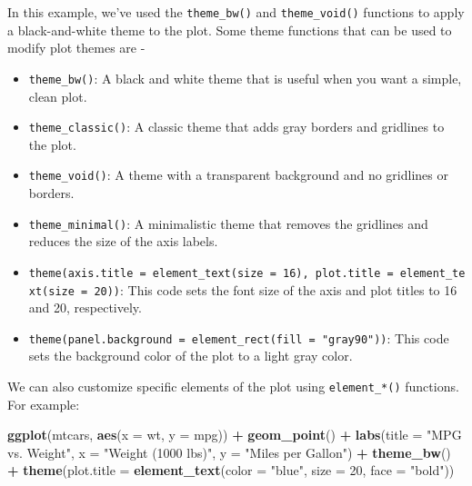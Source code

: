 \documentclass[
]{book}
\newenvironment{Shaded}{\begin{snugshade}}{\end{snugshade}}
\newcommand{\AttributeTok}[1]{\textcolor[rgb]{0.13,0.29,0.53}{#1}}
\newcommand{\DecValTok}[1]{\textcolor[rgb]{0.00,0.00,0.81}{#1}}
\newcommand{\FunctionTok}[1]{\textcolor[rgb]{0.13,0.29,0.53}{\textbf{#1}}}
\newcommand{\NormalTok}[1]{#1}
\newcommand{\SpecialCharTok}[1]{\textcolor[rgb]{0.81,0.36,0.00}{\textbf{#1}}}
\newcommand{\StringTok}[1]{\textcolor[rgb]{0.31,0.60,0.02}{#1}}
\providecommand{\tightlist}{%
  \setlength{\itemsep}{0pt}\setlength{\parskip}{0pt}}
\begin{document}
In this example, we've used the \texttt{theme\_bw()} and \texttt{theme\_void()} functions to apply a black-and-white theme to the plot. Some theme functions that can be used to modify plot themes are -

\begin{itemize}
\tightlist
\item
  \texttt{theme\_bw()}: A black and white theme that is useful when you want a simple, clean plot.
\item
  \texttt{theme\_classic()}: A classic theme that adds gray borders and gridlines to the plot.
\item
  \texttt{theme\_void()}: A theme with a transparent background and no gridlines or borders.
\item
  \texttt{theme\_minimal()}: A minimalistic theme that removes the gridlines and reduces the size of the axis labels.
\item
  \texttt{theme(axis.title\ =\ element\_text(size\ =\ 16),\ plot.title\ =\ element\_text(size\ =\ 20))}: This code sets the font size of the axis and plot titles to 16 and 20, respectively.
\item
  \texttt{theme(panel.background\ =\ element\_rect(fill\ =\ "gray90"))}: This code sets the background color of the plot to a light gray color.
\end{itemize}

We can also customize specific elements of the plot using \texttt{element\_*()} functions. For example:

\begin{Shaded}
\begin{Highlighting}[]
\FunctionTok{ggplot}\NormalTok{(mtcars, }\FunctionTok{aes}\NormalTok{(}\AttributeTok{x =}\NormalTok{ wt, }\AttributeTok{y =}\NormalTok{ mpg)) }\SpecialCharTok{+}
  \FunctionTok{geom\_point}\NormalTok{() }\SpecialCharTok{+}
  \FunctionTok{labs}\NormalTok{(}\AttributeTok{title =} \StringTok{"MPG vs. Weight"}\NormalTok{,}
       \AttributeTok{x =} \StringTok{"Weight (1000 lbs)"}\NormalTok{,}
       \AttributeTok{y =} \StringTok{"Miles per Gallon"}\NormalTok{) }\SpecialCharTok{+}
  \FunctionTok{theme\_bw}\NormalTok{() }\SpecialCharTok{+}
  \FunctionTok{theme}\NormalTok{(}\AttributeTok{plot.title =} \FunctionTok{element\_text}\NormalTok{(}\AttributeTok{color =} \StringTok{"blue"}\NormalTok{, }\AttributeTok{size =} \DecValTok{20}\NormalTok{, }\AttributeTok{face =} \StringTok{"bold"}\NormalTok{))}
\end{Highlighting}
\end{Shaded}
\end{document}
